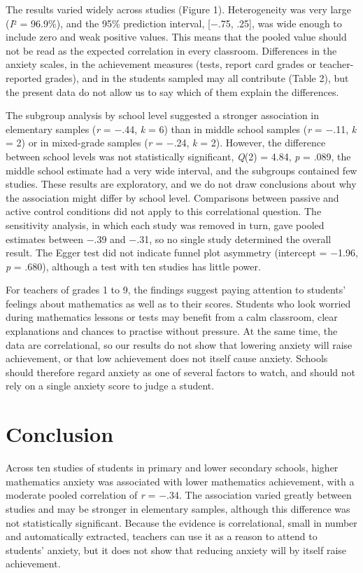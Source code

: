 \documentclass[man,a4paper,12pt,floatsintext,nolmodern,notab]{apa7}
\begin{document}
The results varied widely across studies (Figure 1). Heterogeneity was very large (\textit{I}² = 96.9\%), and the 95\% prediction interval, [\ensuremath{-}.75, .25], was wide enough to include zero and weak positive values. This means that the pooled value should not be read as the expected correlation in every classroom. Differences in the anxiety scales, in the achievement measures (tests, report card grades or teacher-reported grades), and in the students sampled may all contribute (Table 2), but the present data do not allow us to say which of them explain the differences.

The subgroup analysis by school level suggested a stronger association in elementary samples (\textit{r} = \ensuremath{-}.44, \textit{k} = 6) than in middle school samples (\textit{r} = \ensuremath{-}.11, \textit{k} = 2) or in mixed-grade samples (\textit{r} = \ensuremath{-}.24, \textit{k} = 2). However, the difference between school levels was not statistically significant, \textit{Q}(2) = 4.84, \textit{p} = .089, the middle school estimate had a very wide interval, and the subgroups contained few studies. These results are exploratory, and we do not draw conclusions about why the association might differ by school level. Comparisons between passive and active control conditions did not apply to this correlational question. The sensitivity analysis, in which each study was removed in turn, gave pooled estimates between \ensuremath{-}.39 and \ensuremath{-}.31, so no single study determined the overall result. The Egger test did not indicate funnel plot asymmetry (intercept = \ensuremath{-}1.96, \textit{p} = .680), although a test with ten studies has little power.

For teachers of grades 1 to 9, the findings suggest paying attention to students' feelings about mathematics as well as to their scores. Students who look worried during mathematics lessons or tests may benefit from a calm classroom, clear explanations and chances to practise without pressure. At the same time, the data are correlational, so our results do not show that lowering anxiety will raise achievement, or that low achievement does not itself cause anxiety. Schools should therefore regard anxiety as one of several factors to watch, and should not rely on a single anxiety score to judge a student.

\section{Conclusion}
Across ten studies of students in primary and lower secondary schools, higher mathematics anxiety was associated with lower mathematics achievement, with a moderate pooled correlation of \textit{r} = \ensuremath{-}.34. The association varied greatly between studies and may be stronger in elementary samples, although this difference was not statistically significant. Because the evidence is correlational, small in number and automatically extracted, teachers can use it as a reason to attend to students' anxiety, but it does not show that reducing anxiety will by itself raise achievement.
\end{document}
